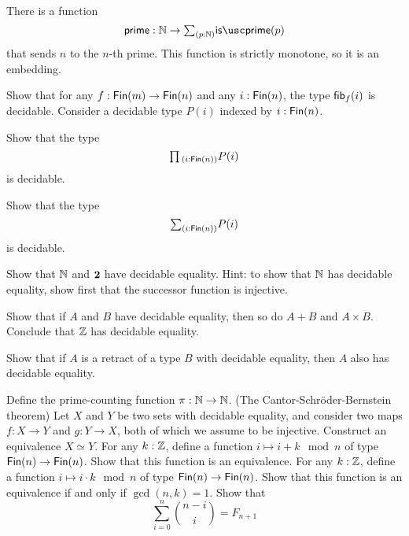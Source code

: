 \begin{cor}
  There is a function
  \begin{equation*}
    \primetype : \N \to \sm{p:\N}\isprime(p)
  \end{equation*}
  that sends $n$ to the $n$-th prime. This function is strictly monotone, so it is an embedding.
\end{cor}

\begin{exercises}
  \exercise Show that for any $f:\mathsf{Fin}(m)\to\mathsf{Fin}(n)$ and any $i:\mathsf{Fin}(n)$, the type $\mathsf{fib}_{f}(i)$ is decidable.
  \exercise Consider a decidable type $P(i)$ indexed by $i:\mathsf{Fin}(n)$.
  \begin{subexenum}
  \item Show that the type
    \begin{equation*}
      \prd{i:\Fin(n)}P(i)
    \end{equation*}
    is decidable.
  \item Show that the type
    \begin{equation*}
      \sm{i:\Fin(n)}P(i)
    \end{equation*}
    is decidable.
  \end{subexenum}
  \exercise
  \begin{subexenum}
  \item Show that ${\mathbb{N}}$ and $\mathbf{2}$ have decidable equality. Hint: to show that ${\mathbb{N}}$ has decidable equality, show first that the successor function is injective.
  \item Show that if $A$ and $B$ have decidable equality, then so do $A+B$ and $A\times B$. Conclude that ${\mathbb{Z}}$ has decidable equality.
  \item Show that if $A$ is a retract of a type $B$ with decidable equality, then $A$ also has decidable equality.
  \end{subexenum}
  \exercise Define the prime-counting function $\pi:{\mathbb{N}}\to{\mathbb{N}}$.
  \exercise (The Cantor-Schr\"oder-Bernstein theorem) Let $X$ and $Y$ be two sets with decidable equality, and consider two maps $f:X\to Y$ and $g:Y\to X$, both of which we assume to be injective. Construct an equivalence $X\simeq Y$.
  \exercise For any $k:{\mathbb{Z}}$, define a function $i\mapsto i+k \mod n$ of type $\mathsf{Fin}(n)\to\mathsf{Fin}(n)$. Show that this function is an equivalence.
  \exercise For any $k:{\mathbb{Z}}$, define a function $i\mapsto i\cdot k \mod n$ of type $\mathsf{Fin}(n)\to\mathsf{Fin}(n)$. Show that this function is an equivalence if and only if $\gcd(n,k)=1$.
  \exercise Show that
  \begin{equation*}
    \sum_{i=0}^n \binom{n-i}{i}=F_{n+1}

\end{equation*}
\end{exercises}
